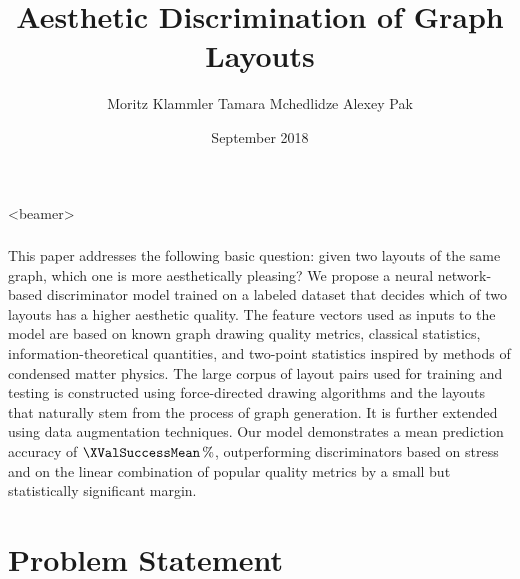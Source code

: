 \documentclass{beamer}
\title{Aesthetic Discrimination of Graph Layouts}
\subtitle{Moritz Klammler {\textand} Tamara Mchedlidze {\textand} Alexey Pak}
\institute[M.~Klammler {\textand} T.~Mchedlidze {\textand} A.~Pak]{%
  26\textsuperscript{th} International Symposium on Graph Drawing and Network Visualization, Barcelona (2018)
}
\date{September 2018}
\providecommand*{\BonusSlide}{beamer}
\begin{document}
\begin{frame}
  \maketitle
\end{frame}

\begin{frame}<\BonusSlide>
  \frametitle{\abstractname}
  \noindent\parbox{\textwidth}{%
    \footnotesize
    This paper addresses the following basic question: given two layouts of the same graph, which one is more
    aesthetically pleasing? We propose a neural network-based discriminator model trained on a labeled dataset that
    decides which of two layouts has a higher aesthetic quality. The feature vectors used as inputs to the model are
    based on known graph drawing quality metrics, classical statistics, information-theoretical quantities, and
    two-point statistics inspired by methods of condensed matter physics. The large corpus of layout pairs used for
    training and testing is constructed using force-directed drawing algorithms and the layouts that naturally stem from
    the process of graph generation. It is further extended using data augmentation techniques. Our model demonstrates a
    mean prediction accuracy of $\XValSuccessMean\percent$, outperforming discriminators based on stress and on the
    linear combination of popular quality metrics by a small but statistically significant margin.
  }
  \vfill
\end{frame}

\section{Problem Statement}
\end{document}
